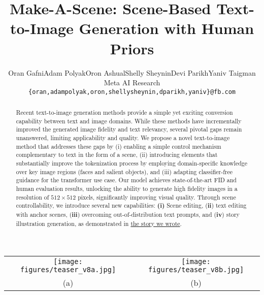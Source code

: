 \documentclass[final]{cvpr}
\begin{document}
\title{Make-A-Scene: Scene-Based Text-to-Image Generation with Human Priors}

\author{Oran Gafni\quad Adam Polyak\quad Oron Ashual\quad Shelly Sheynin\quad Devi Parikh\quad Yaniv Taigman\\
Meta AI Research\\
{\tt\small {\{oran,adampolyak,oron,shellysheynin,dparikh,yaniv\}@fb.com}}\vspace{-1cm}}

\maketitle


\begin{strip}\centering
  \centering
  \begin{tabular}{c@{~~~~~~}c}
  \texttt{[image: figures/teaser\_v8a.jpg]} & 
  \texttt{[image: figures/teaser\_v8b.jpg]} \\
  (a) & (b)
  \end{tabular}
  \label{fig:teaser}
\end{strip}


\begin{abstract}\vspace{-0.2cm}
Recent text-to-image generation methods provide a simple yet exciting conversion capability between text and image domains. While these methods have incrementally improved the generated image fidelity and text relevancy, several pivotal gaps remain unanswered, limiting applicability and quality.
We propose a novel text-to-image method that addresses these gaps by (i) enabling a simple control mechanism complementary to text in the form of a scene, (ii) introducing elements that substantially improve the tokenization process by employing domain-specific knowledge over key image regions (faces and salient objects), and (iii) adapting classifier-free guidance for the transformer use case. 
Our model achieves state-of-the-art FID and human evaluation results, unlocking the ability to generate high fidelity images in a resolution of $512\times512$ pixels, significantly improving visual quality. 
Through scene controllability, we introduce several new capabilities: \textbf{(i)} Scene editing, (\textbf{ii}) text editing with anchor scenes, (\textbf{iii}) overcoming out-of-distribution text prompts, and (\textbf{iv}) story illustration generation, as demonstrated in \href{https://youtu.be/QLTyqoJJKTo}{the story we wrote}.
\end{abstract}
\end{document}
